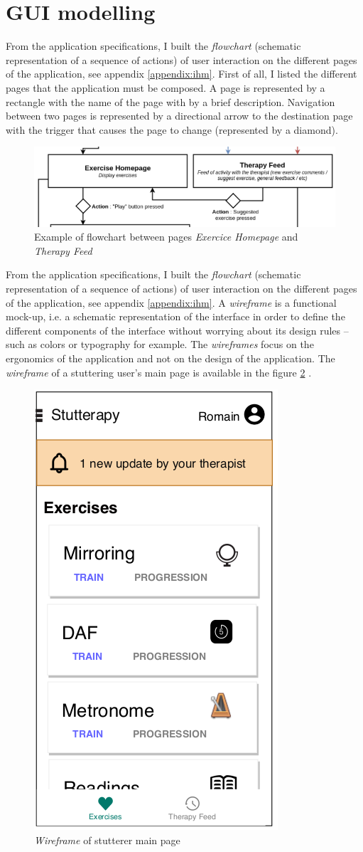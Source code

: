 \section{GUI modelling}

From the application specifications, I built the \textit{flowchart} (schematic representation of a sequence of actions) of user interaction on the different pages of the application, see appendix \ref{appendix:ihm}. First of all, I listed the different pages that the application must be composed. A page is represented by a rectangle with the name of the page with by a brief description. Navigation between two pages is represented by a directional arrow to the destination page with the trigger that causes the page to change (represented by a diamond).

\begin{figure}[H]
  \includegraphics[width=.8\linewidth]{content/imgs/ihm_ex.png}
  \caption{Example of flowchart between pages \textit{Exercice Homepage} and \textit{Therapy Feed}}
  \label{fig:flowchart}
\end{figure}

From the application specifications, I built the \textit{flowchart} (schematic representation of a sequence of actions) of user interaction on the different pages of the application, see appendix \ref{appendix:ihm}. A \textit{wireframe} is a functional mock-up, i.e. a schematic representation of the interface in order to define the different components of the interface without worrying about its design rules -- such as colors or typography for example. The \textit{wireframes} focus on the ergonomics of the application and not on the design of the application. The \textit{wireframe} of a stuttering user's main page is available in the figure \ref{fig:wireframe} .


\begin{figure}[H]
  \includegraphics[width=.3\linewidth]{content/imgs/wireframe_ex.png}
  \caption{\textit{Wireframe} of stutterer main page}
  \label{fig:wireframe}
\end{figure}
